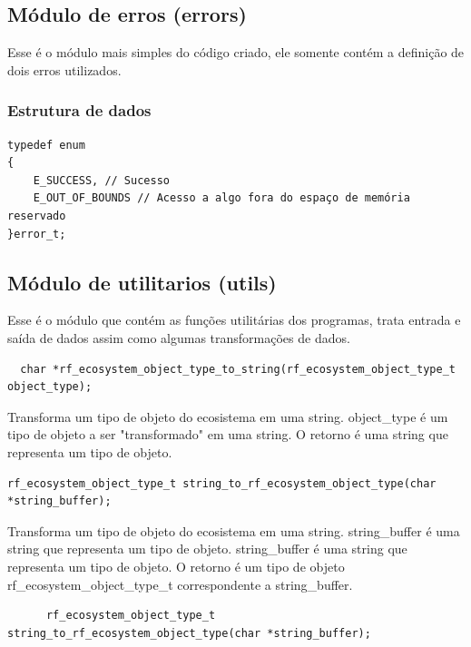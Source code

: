 \documentclass[12pt]{article}
\begin{document}
\subsection{Módulo de erros (errors)}

Esse é o módulo mais simples do código criado, ele somente contém a definição de dois erros utilizados.

\subsubsection{Estrutura de dados}

\begin{verbatim}
typedef enum
{
    E_SUCCESS, // Sucesso
    E_OUT_OF_BOUNDS // Acesso a algo fora do espaço de memória reservado
}error_t;
\end{verbatim}

\subsection{Módulo de utilitarios (utils)}

Esse é o módulo que contém as funções utilitárias dos programas, trata entrada e saída de dados assim como algumas transformações de dados.


\begin{verbatim}
  char *rf_ecosystem_object_type_to_string(rf_ecosystem_object_type_t object_type);
\end{verbatim}

Transforma um tipo de objeto do ecosistema em uma string. object\_type é um tipo de objeto a ser "transformado" em uma string. O retorno é uma string que representa um tipo de objeto.

\begin{verbatim}
rf_ecosystem_object_type_t string_to_rf_ecosystem_object_type(char *string_buffer);
\end{verbatim}

Transforma um tipo de objeto do ecosistema em uma string. string\_buffer é uma string que representa um tipo de objeto. string\_buffer é uma string que representa um tipo de objeto. O retorno é um tipo de objeto rf\_ecosystem\_object\_type\_t correspondente a string\_buffer.

\begin{verbatim}
      rf_ecosystem_object_type_t string_to_rf_ecosystem_object_type(char *string_buffer);
      \end{verbatim}
\end{document}
